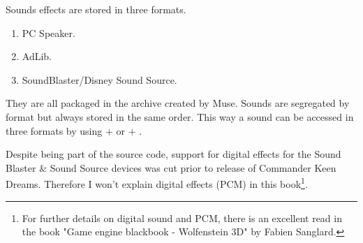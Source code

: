 \documentclass[book.tex]{subfiles}
\begin{document}
\par
Sounds effects are stored in three formats.
\begin{enumerate}
\item PC Speaker.
\item AdLib.
\item SoundBlaster/Disney Sound Source. 
\end{enumerate}

They are all packaged in the  archive created by Muse. Sounds are segregated by format but always stored in the same order. This way a sound can be accessed in three formats by using  +  or  + .\\
\par

Despite being part of the source code, support for digital effects for the Sound Blaster \& Sound Source devices was cut prior to release of Commander Keen Dreams. Therefore I won't  explain digital effects (PCM) in this book\footnote{For further details on digital sound and PCM, there is an excellent read in the book "Game engine blackbook - Wolfenstein 3D" by Fabien Sanglard.}.

\begin{minipage}{\textwidth}

\end{minipage}
\end{document}

